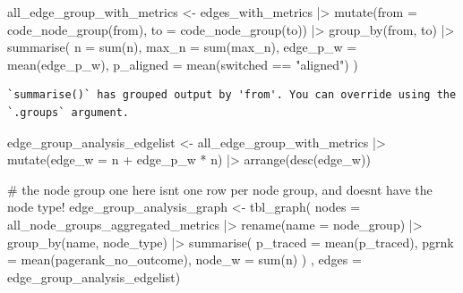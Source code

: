 \documentclass[
  letterpaper,
  DIV=11,
  numbers=noendperiod]{scrartcl}
\newenvironment{Shaded}{\begin{snugshade}}{\end{snugshade}}
\newcommand{\AttributeTok}[1]{\textcolor[rgb]{0.40,0.45,0.13}{#1}}
\newcommand{\CommentTok}[1]{\textcolor[rgb]{0.37,0.37,0.37}{#1}}
\newcommand{\FunctionTok}[1]{\textcolor[rgb]{0.28,0.35,0.67}{#1}}
\newcommand{\NormalTok}[1]{\textcolor[rgb]{0.00,0.23,0.31}{#1}}
\newcommand{\OtherTok}[1]{\textcolor[rgb]{0.00,0.23,0.31}{#1}}
\newcommand{\SpecialCharTok}[1]{\textcolor[rgb]{0.37,0.37,0.37}{#1}}
\newcommand{\StringTok}[1]{\textcolor[rgb]{0.13,0.47,0.30}{#1}}
\begin{document}
\begin{Shaded}
\begin{Highlighting}[]
\NormalTok{all\_edge\_group\_with\_metrics }\OtherTok{\textless{}{-}}
\NormalTok{    edges\_with\_metrics }\SpecialCharTok{|\textgreater{}} 
    \FunctionTok{mutate}\NormalTok{(}\AttributeTok{from =} \FunctionTok{code\_node\_group}\NormalTok{(from),}
           \AttributeTok{to =} \FunctionTok{code\_node\_group}\NormalTok{(to)) }\SpecialCharTok{|\textgreater{}} 
    \FunctionTok{group\_by}\NormalTok{(from, to) }\SpecialCharTok{|\textgreater{}} 
    \FunctionTok{summarise}\NormalTok{(}
        \AttributeTok{n =} \FunctionTok{sum}\NormalTok{(n),}
        \AttributeTok{max\_n =} \FunctionTok{sum}\NormalTok{(max\_n),}
        \AttributeTok{edge\_p\_w =} \FunctionTok{mean}\NormalTok{(edge\_p\_w),}
        \AttributeTok{p\_aligned =} \FunctionTok{mean}\NormalTok{(switched }\SpecialCharTok{==} \StringTok{"aligned"}\NormalTok{)}
\NormalTok{    )}
\end{Highlighting}
\end{Shaded}

\begin{verbatim}
`summarise()` has grouped output by 'from'. You can override using the
`.groups` argument.
\end{verbatim}

\begin{Shaded}
\begin{Highlighting}[]
\NormalTok{edge\_group\_analysis\_edgelist }\OtherTok{\textless{}{-}}\NormalTok{ all\_edge\_group\_with\_metrics }\SpecialCharTok{|\textgreater{}} 
    \FunctionTok{mutate}\NormalTok{(}\AttributeTok{edge\_w =}\NormalTok{ n }\SpecialCharTok{+}\NormalTok{ edge\_p\_w }\SpecialCharTok{*}\NormalTok{ n) }\SpecialCharTok{|\textgreater{}} 
    \FunctionTok{arrange}\NormalTok{(}\FunctionTok{desc}\NormalTok{(edge\_w))}


\CommentTok{\# the node group one here isn\textquotesingle{}t one row per node group, and doesn\textquotesingle{}t have the node type!}
\NormalTok{edge\_group\_analysis\_graph }\OtherTok{\textless{}{-}} \FunctionTok{tbl\_graph}\NormalTok{(}
    \AttributeTok{nodes =}\NormalTok{ all\_node\_groups\_aggregated\_metrics }\SpecialCharTok{|\textgreater{}} 
        \FunctionTok{rename}\NormalTok{(}\AttributeTok{name =}\NormalTok{ node\_group) }\SpecialCharTok{|\textgreater{}} 
        \FunctionTok{group\_by}\NormalTok{(name, node\_type) }\SpecialCharTok{|\textgreater{}} 
        \FunctionTok{summarise}\NormalTok{(}
            \AttributeTok{p\_traced =} \FunctionTok{mean}\NormalTok{(p\_traced),}
            \AttributeTok{pgrnk =} \FunctionTok{mean}\NormalTok{(pagerank\_no\_outcome),}
            \AttributeTok{node\_w =} \FunctionTok{sum}\NormalTok{(n)}
\NormalTok{        ) , }
    \AttributeTok{edges =}\NormalTok{ edge\_group\_analysis\_edgelist)}
\end{Highlighting}
\end{Shaded}
\end{document}
